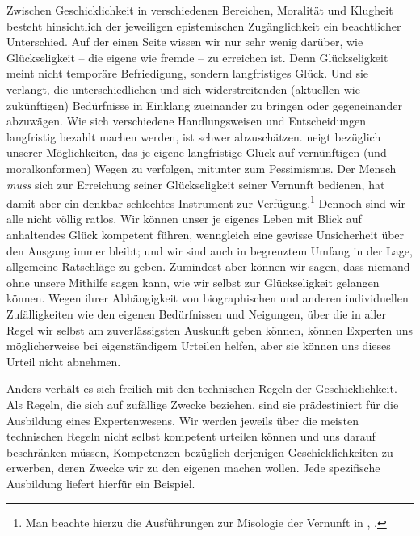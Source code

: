 Zwischen Geschicklichkeit in verschiedenen Bereichen, Moralität und Klugheit
besteht hinsichtlich der jeweiligen epistemischen Zugänglichkeit ein
beachtlicher Unterschied.
Auf der einen Seite wissen wir nur sehr wenig darüber, wie Glückseligkeit -- die eigene
wie fremde -- zu erreichen ist. Denn Glückseligkeit meint nicht temporäre
Befriedigung, sondern langfristiges Glück. Und sie verlangt, die
unterschiedlichen und sich widerstreitenden (aktuellen wie zukünftigen)
Bedürfnisse in Einklang zueinander zu bringen oder gegeneinander abzuwägen. Wie
sich verschiedene Handlungsweisen und Entscheidungen langfristig bezahlt machen
werden, ist schwer abzuschätzen.  neigt bezüglich unserer
Möglichkeiten, das je eigene langfristige Glück auf vernünftigen (und
moralkonformen) Wegen zu verfolgen, mitunter zum Pessimismus. Der
Mensch \emph{muss} sich zur Erreichung seiner Glückseligkeit seiner Vernunft
bedienen, hat damit aber ein denkbar schlechtes Instrument zur
Verfügung.\footnote{Man beachte hierzu die Ausführungen zur Misologie der
Vernunft in \cite[BA 4--8]{Kant:GrundlegungzurMetaphysikderSitten1965},
\cite[IV: 395.4--396.37]{Kant:GesammelteWerke1900ff.}.} Dennoch sind wir alle
nicht völlig ratlos. Wir können unser je eigenes Leben mit Blick auf anhaltendes
Glück kompetent führen, wenngleich eine gewisse Unsicherheit über den Ausgang
immer bleibt; und wir sind auch in begrenztem Umfang in der Lage, allgemeine
Ratschläge zu geben. Zumindest aber können wir sagen, dass niemand ohne unsere
Mithilfe sagen kann, wie wir selbst zur Glückseligkeit gelangen können. Wegen
ihrer Abhängigkeit von biographischen und anderen individuellen Zufälligkeiten
wie den eigenen Bedürfnissen und Neigungen, über die in aller Regel wir selbst
am zuverlässigsten Auskunft geben können, können Experten uns möglicherweise bei
eigenständigem Urteilen helfen, aber sie können uns dieses Urteil nicht
abnehmen.

Anders verhält es sich freilich mit den technischen Regeln der Geschicklichkeit.
Als Regeln, die sich auf zufällige Zwecke beziehen, sind sie prädestiniert für
die Ausbildung eines Expertenwesens. Wir werden jeweils über die meisten
technischen Regeln nicht selbst kompetent urteilen können und uns darauf
beschränken müssen, Kompetenzen bezüglich derjenigen Geschicklichkeiten zu
erwerben, deren Zwecke wir zu den eigenen machen wollen. Jede spezifische
Ausbildung liefert hierfür ein Beispiel.


